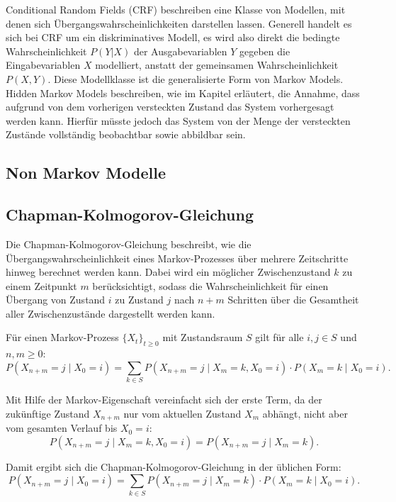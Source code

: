 Conditional Random Fields (CRF) beschreiben eine Klasse von Modellen, mit denen sich Übergangswahrscheinlichkeiten darstellen lassen. Generell handelt es sich bei CRF um ein diskriminatives Modell, es wird also direkt die bedingte Wahrscheinlichkeit $P(Y|X)$ der Ausgabevariablen $Y$ gegeben die Eingabevariablen $X$ modelliert, anstatt der gemeinsamen Wahrscheinlichkeit $P(X, Y)$.
Diese Modellklasse ist die generalisierte Form von Markov Models. Hidden Markov Models beschreiben, wie im Kapitel erläutert, die Annahme, dass aufgrund von dem vorherigen versteckten Zustand das System vorhergesagt werden kann. Hierfür müsste jedoch das System von der Menge der versteckten Zustände vollständig beobachtbar sowie abbildbar sein.

\subsection{Non Markov Modelle}



\subsection{Chapman-Kolmogorov-Gleichung}

Die Chapman-Kolmogorov-Gleichung beschreibt, wie die Übergangswahrscheinlichkeit eines Markov-Prozesses über mehrere Zeitschritte hinweg berechnet werden kann. 
Dabei wird ein möglicher Zwischenzustand $k$ zu einem Zeitpunkt $m$ berücksichtigt, sodass die Wahrscheinlichkeit für einen Übergang von Zustand $i$ zu Zustand $j$ nach $n+m$ Schritten über die Gesamtheit aller Zwischenzustände dargestellt werden kann.

Für einen Markov-Prozess $\{X_t\}_{t \geq 0}$ mit Zustandsraum $S$ gilt für alle $i, j \in S$ und $n, m \geq 0$:
\begin{equation}
P(X_{n+m} = j \mid X_0 = i) = \sum_{k \in S} P(X_{n+m} = j \mid X_m = k, X_0 = i) \cdot P(X_m = k \mid X_0 = i).
\end{equation}

Mit Hilfe der Markov-Eigenschaft vereinfacht sich der erste Term, da der zukünftige Zustand $X_{n+m}$ nur vom aktuellen Zustand $X_m$ abhängt, nicht aber vom gesamten Verlauf bis $X_0 = i$:
\begin{equation}
P(X_{n+m} = j \mid X_m = k, X_0 = i) = P(X_{n+m} = j \mid X_m = k).
\end{equation}

Damit ergibt sich die Chapman-Kolmogorov-Gleichung in der üblichen Form:
\begin{equation}
P(X_{n+m} = j \mid X_0 = i) = \sum_{k \in S} P(X_{n+m} = j \mid X_m = k) \cdot P(X_m = k \mid X_0 = i).
\end{equation}

